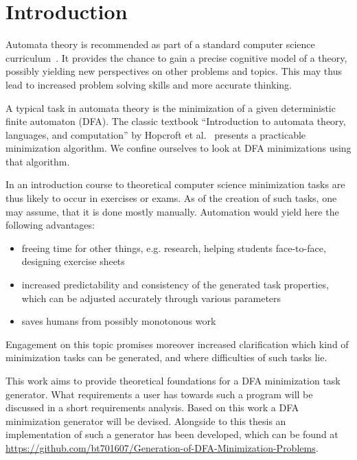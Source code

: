 
\chapter{Introduction} \label{ch:1}


Automata theory is recommended as part of a standard computer science curriculum~\cite[pp. 5-6]{GI16}. It provides the chance to gain a precise cognitive model of a theory, possibly yielding new perspectives on other problems and topics. This may thus lead to increased problem solving skills and more accurate thinking.


A typical task in automata theory is the minimization of a given deterministic finite automaton (DFA). The classic textbook ``Introduction to automata theory, languages, and computation'' by Hopcroft et al.~\cite{HMU01} presents a practicable minimization algorithm. We confine ourselves to look at DFA minimizations using that algorithm.


In an introduction course to theoretical computer science minimization tasks are thus likely to occur in exercises or exams. As of the creation of such tasks, one may assume, that it is done mostly manually. Automation would yield here the following advantages:

\begin{itemize}
	\item freeing time for other things, e.g. research, helping students face-to-face, designing exercise sheets
	
	\item increased predictability and consistency of the generated task properties, which can be adjusted accurately through various parameters
	
	\item saves humans from possibly monotonous work
\end{itemize}
Engagement on this topic promises moreover increased clarification which kind of minimization tasks can be generated, and where difficulties of such tasks lie.

This work aims to provide theoretical foundations for a DFA minimization task generator. What requirements a user has towards such a program will be discussed in a short requirements analysis. Based on this work a DFA minimization generator will be devised. Alongside to this thesis an implementation of such a generator has been developed, which can be found at \url{https://github.com/bt701607/Generation-of-DFA-Minimization-Problems}.
